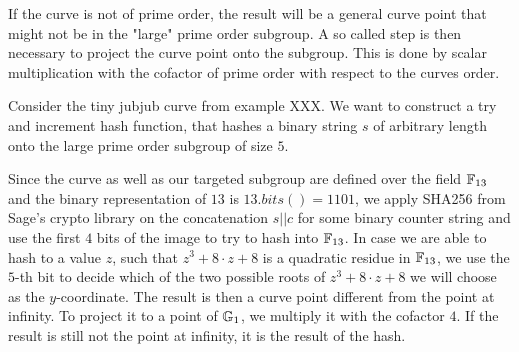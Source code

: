 If the curve is not of prime order, the result will be a general curve point that might not be in the "large" prime order subgroup. A so called  step is then necessary to project the curve point onto the subgroup. This is done by scalar multiplication with the cofactor of prime order with respect to the curves order.
\begin{example} Consider the tiny jubjub curve from example XXX. We want to construct a try and increment hash function, that hashes a binary string $s$ of arbitrary length onto the large prime order subgroup of size $5$. 

Since the curve as well as our targeted subgroup are defined over the field $\mathbb{F}_{13}$ and the binary representation of $13$ is $13.bits()=1101$, we apply SHA256 from Sage's crypto library on the concatenation $s||c$ for some binary counter string and use the first $4$ bits of the image to try to hash into $\mathbb{F}_{13}$. In case we are able to hash to a value $z$, such that $z^3 +8\cdot z + 8$ is a quadratic residue in $\mathbb{F}_{13}$, we use the $5$-th bit to decide which of the two possible roots of $z^3 + 8\cdot z + 8$ we will choose as the $y$-coordinate. The result is then a curve point different from the point at infinity. To project it to a point of $\mathbb{G}_1$, we multiply it with the cofactor $4$. If the result is still not the point at infinity, it is the result of the hash.


\end{example}
